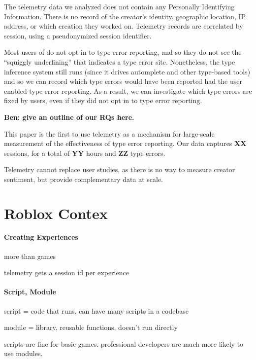 \documentclass[
  acmsmall,
  review,
  anonymous,
]{acmart}
\begin{document}
The telemetry data we analyzed does not contain any Personally
Identifying Information. There is no record of the creator's identity,
geographic location, IP address, or which creation they worked on.
Telemetry records are correlated by session, using a pseudonymized
session identifier.

Most users of  do not opt in to type error
reporting, and so they do not see the ``squiggly underlining'' that
indicates a type error site. Nonetheless, the type inference system
still runs (since it drives automplete and other type-based tools) and
so we can record which type errors would have been reported had the
user enabled type error reporting. As a result, we can investigate
which type errors are  fixed by users, even if they did not opt in to
type error reporting.

\textbf{Ben: give an outline of our RQs here.}

This paper is the first to use telemetry as a mechanism for
large-scale measurement of the effectiveness of type error reporting.
Our data captures \textbf{XX} sessions, for a total of \textbf{YY}
hours and \textbf{ZZ} type errors.

Telemetry cannot replace user studies, as there is no way to measure
creator sentiment, but provide complementary data at scale.

\section{Roblox Contex}

\paragraph{Creating Experiences}

more than games

telemetry gets a session id per experience


\paragraph{Script, Module}


script = code that runs, can have many scripts in a codebase

module = library, reusable functions, doesn't run directly

scripts are fine for basic games. professional developers are much more likely to use modules.
\end{document}
